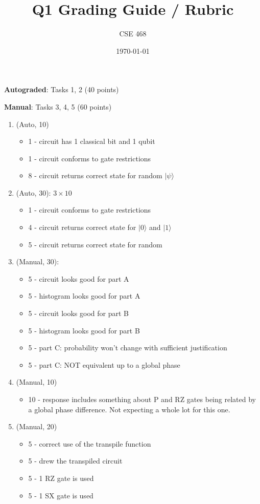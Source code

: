 \documentclass[12pt]{article}
\title{Q1 Grading Guide / Rubric}
\author{CSE 468}
\date{\today}
\begin{document}
\maketitle

\noindent \textbf{Autograded}: Tasks 1, 2 (40 points) 

\noindent \textbf{Manual}: Tasks 3, 4, 5 (60 points)

\begin{enumerate}[font=\bfseries]
    \item (Auto, 10) 
    \begin{itemize}
        \item 1 - circuit has 1 classical bit and 1 qubit
        \item 1 - circuit conforms to gate restrictions
        \item 8 - circuit returns correct state for random $|\psi\rangle$
    \end{itemize}
    \item (Auto, 30): $3\times 10$
    \begin{itemize}
        \item 1 - circuit conforms to gate restrictions
        \item 4 - circuit returns correct state for $|0\rangle$ and $|1\rangle$
        \item 5 - circuit returns correct state for random
    \end{itemize}
    \item (Manual, 30):
    \begin{itemize}
        \item 5 - circuit looks good for part A
        \item 5 - histogram looks good for part A
        \item 5 - circuit looks good for part B
        \item 5 - histogram looks good for part B
        \item 5 - part C: probability won't change with sufficient justification
        \item 5 - part C: NOT equivalent up to a global phase
    \end{itemize}
    \item (Manual, 10)
    \begin{itemize}
        \item 10 - response includes something about P and RZ gates being related by a global phase difference. Not expecting a whole lot for this one.
    \end{itemize}
    \item (Manual, 20)
    \begin{itemize}
        \item 5 - correct use of the transpile function
        \item 5 - drew the transpiled circuit
        \item 5 - 1 RZ gate is used
        \item 5 - 1 SX gate is used
    \end{itemize}
    
    
\end{enumerate}
\end{document}
